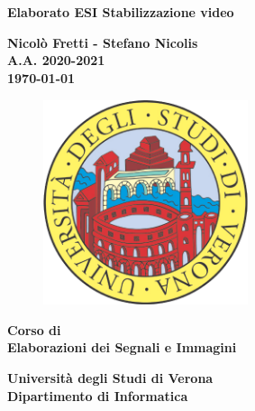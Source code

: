 \documentclass[12pt]{article}
\begin{document}
\begin{titlepage}
   \begin{center}
       \vspace*{1cm}
 
	\large
      {\huge \textbf{Elaborato ESI Stabilizzazione video} }
 
       \vspace{1.5cm}
 
       \textbf{Nicolò Fretti - Stefano Nicolis}\\
	\textbf{A.A. 2020-2021}\\
	\vspace{0.35cm}
	\textbf{\today}

\vfill
\begin{figure}[h!]
	\begin{center}
	  \includegraphics[height=6cm, width=6cm]{media/logounivr}
	\end{center}
\end{figure}
 
	\vfill
 	\textbf{Corso di \\
       Elaborazioni dei Segnali e Immagini\\}
 
       \vspace{3cm}
 
      \begin{multicols}{2}
      \textbf{Università degli Studi di Verona\\
	 Dipartimento di Informatica}
	\end{multicols}
 
   \end{center}
\end{titlepage}


\tableofcontents

\clearpage
\end{document}
